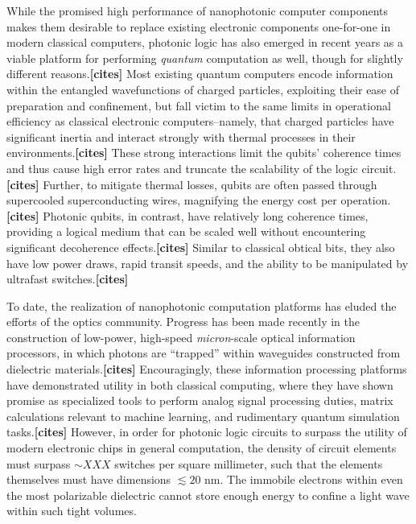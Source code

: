 \documentclass[11pt,a4paper]{article}
\begin{document}
While the promised high performance of nanophotonic computer components makes them desirable to replace existing electronic components one-for-one in modern classical computers, photonic logic has also emerged in recent years as a viable platform for performing \textit{quantum} computation as well, though for slightly different reasons.\textbf{[cites]} Most existing quantum computers encode information within the entangled wavefunctions of charged particles, exploiting their ease of preparation and confinement, but fall victim to the same limits in operational efficiency as classical electronic computers--namely, that charged particles have significant inertia and interact strongly with thermal processes in their environments.\textbf{[cites]} These strong interactions limit the qubits' coherence times and thus cause high error rates and truncate the scalability of the logic circuit.\textbf{[cites]} Further, to mitigate thermal losses, qubits are often passed through supercooled superconducting wires, magnifying the energy cost per operation.\textbf{[cites]} Photonic qubits, in contrast, have relatively long coherence times, providing a logical medium that can be scaled well without encountering significant decoherence effects.\textbf{[cites]} Similar to classical obtical bits, they also have low power draws, rapid transit speeds, and the ability to be manipulated by ultrafast switches.\textbf{[cites]}




To date, the realization of nanophotonic computation platforms has eluded the efforts of the optics community. Progress has been made recently in the construction of low-power, high-speed \textit{micron}-scale optical information processors, in which photons are ``trapped'' within waveguides constructed from dielectric materials.\textbf{[cites]} Encouragingly, these information processing platforms have demonstrated utility in both classical computing, where they have shown promise as specialized tools to perform analog signal processing duties, matrix calculations relevant to machine learning, and rudimentary quantum simulation tasks.\textbf{[cites]} However, in order for photonic logic circuits to surpass the utility of modern electronic chips in general computation, the density of circuit elements must surpass $\sim XXX$ switches per square millimeter, such that the elements themselves must have dimensions $\lesssim 20$ nm. The immobile electrons within even the most polarizable dielectric cannot store enough energy to confine a light wave within such tight volumes.
\end{document}
